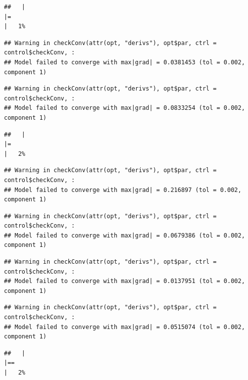 \documentclass[
  12pt,
]{book}
\begin{document}
\begin{verbatim}
##   |                                                                              |=                                                                     |   1%
\end{verbatim}

\begin{verbatim}
## Warning in checkConv(attr(opt, "derivs"), opt$par, ctrl = control$checkConv, :
## Model failed to converge with max|grad| = 0.0381453 (tol = 0.002, component 1)
\end{verbatim}

\begin{verbatim}
## Warning in checkConv(attr(opt, "derivs"), opt$par, ctrl = control$checkConv, :
## Model failed to converge with max|grad| = 0.0833254 (tol = 0.002, component 1)
\end{verbatim}

\begin{verbatim}
##   |                                                                              |=                                                                     |   2%
\end{verbatim}

\begin{verbatim}
## Warning in checkConv(attr(opt, "derivs"), opt$par, ctrl = control$checkConv, :
## Model failed to converge with max|grad| = 0.216897 (tol = 0.002, component 1)
\end{verbatim}

\begin{verbatim}
## Warning in checkConv(attr(opt, "derivs"), opt$par, ctrl = control$checkConv, :
## Model failed to converge with max|grad| = 0.0679386 (tol = 0.002, component 1)
\end{verbatim}

\begin{verbatim}
## Warning in checkConv(attr(opt, "derivs"), opt$par, ctrl = control$checkConv, :
## Model failed to converge with max|grad| = 0.0137951 (tol = 0.002, component 1)
\end{verbatim}

\begin{verbatim}
## Warning in checkConv(attr(opt, "derivs"), opt$par, ctrl = control$checkConv, :
## Model failed to converge with max|grad| = 0.0515074 (tol = 0.002, component 1)
\end{verbatim}

\begin{verbatim}
##   |                                                                              |==                                                                    |   2%
\end{verbatim}
\end{document}
